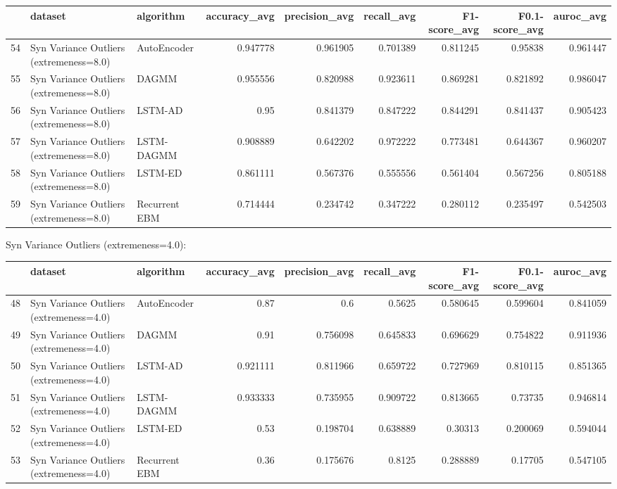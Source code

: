 \begin{tabular}{rllrrrrrr}
\hline
    & dataset                                 & algorithm     &   accuracy\_avg &   precision\_avg &   recall\_avg &   F1-score\_avg &   F0.1-score\_avg &   auroc\_avg \\
\hline
 54 & Syn Variance Outliers (extremeness=8.0) & AutoEncoder   &       0.947778 &        0.961905 &     0.701389 &       0.811245 &         0.95838  &    0.961447 \\
 55 & Syn Variance Outliers (extremeness=8.0) & DAGMM         &       0.955556 &        0.820988 &     0.923611 &       0.869281 &         0.821892 &    0.986047 \\
 56 & Syn Variance Outliers (extremeness=8.0) & LSTM-AD       &       0.95     &        0.841379 &     0.847222 &       0.844291 &         0.841437 &    0.905423 \\
 57 & Syn Variance Outliers (extremeness=8.0) & LSTM-DAGMM    &       0.908889 &        0.642202 &     0.972222 &       0.773481 &         0.644367 &    0.960207 \\
 58 & Syn Variance Outliers (extremeness=8.0) & LSTM-ED       &       0.861111 &        0.567376 &     0.555556 &       0.561404 &         0.567256 &    0.805188 \\
 59 & Syn Variance Outliers (extremeness=8.0) & Recurrent EBM &       0.714444 &        0.234742 &     0.347222 &       0.280112 &         0.235497 &    0.542503 \\
\hline
\end{tabular}

Syn Variance Outliers (extremeness=4.0):

\begin{tabular}{rllrrrrrr}
\hline
    & dataset                                 & algorithm     &   accuracy\_avg &   precision\_avg &   recall\_avg &   F1-score\_avg &   F0.1-score\_avg &   auroc\_avg \\
\hline
 48 & Syn Variance Outliers (extremeness=4.0) & AutoEncoder   &       0.87     &        0.6      &     0.5625   &       0.580645 &         0.599604 &    0.841059 \\
 49 & Syn Variance Outliers (extremeness=4.0) & DAGMM         &       0.91     &        0.756098 &     0.645833 &       0.696629 &         0.754822 &    0.911936 \\
 50 & Syn Variance Outliers (extremeness=4.0) & LSTM-AD       &       0.921111 &        0.811966 &     0.659722 &       0.727969 &         0.810115 &    0.851365 \\
 51 & Syn Variance Outliers (extremeness=4.0) & LSTM-DAGMM    &       0.933333 &        0.735955 &     0.909722 &       0.813665 &         0.73735  &    0.946814 \\
 52 & Syn Variance Outliers (extremeness=4.0) & LSTM-ED       &       0.53     &        0.198704 &     0.638889 &       0.30313  &         0.200069 &    0.594044 \\
 53 & Syn Variance Outliers (extremeness=4.0) & Recurrent EBM &       0.36     &        0.175676 &     0.8125   &       0.288889 &         0.17705  &    0.547105 \\
\hline
\end{tabular}

